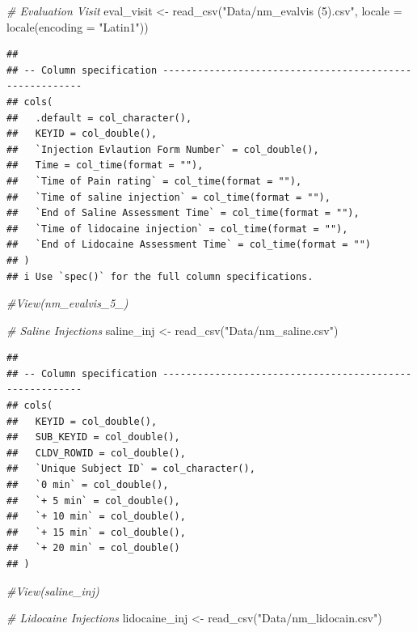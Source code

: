 \documentclass[
]{article}
\newenvironment{Shaded}{\begin{snugshade}}{\end{snugshade}}
\newcommand{\AttributeTok}[1]{\textcolor[rgb]{0.77,0.63,0.00}{#1}}
\newcommand{\CommentTok}[1]{\textcolor[rgb]{0.56,0.35,0.01}{\textit{#1}}}
\newcommand{\FunctionTok}[1]{\textcolor[rgb]{0.00,0.00,0.00}{#1}}
\newcommand{\NormalTok}[1]{#1}
\newcommand{\OtherTok}[1]{\textcolor[rgb]{0.56,0.35,0.01}{#1}}
\newcommand{\StringTok}[1]{\textcolor[rgb]{0.31,0.60,0.02}{#1}}
\begin{document}
\begin{Shaded}
\begin{Highlighting}[]
\CommentTok{\# Evaluation Visit}
\NormalTok{eval\_visit }\OtherTok{\textless{}{-}} \FunctionTok{read\_csv}\NormalTok{(}\StringTok{"Data/nm\_evalvis (5).csv"}\NormalTok{, }\AttributeTok{locale =} \FunctionTok{locale}\NormalTok{(}\AttributeTok{encoding =} \StringTok{"Latin1"}\NormalTok{))}
\end{Highlighting}
\end{Shaded}

\begin{verbatim}
## 
## -- Column specification --------------------------------------------------------
## cols(
##   .default = col_character(),
##   KEYID = col_double(),
##   `Injection Evlaution Form Number` = col_double(),
##   Time = col_time(format = ""),
##   `Time of Pain rating` = col_time(format = ""),
##   `Time of saline injection` = col_time(format = ""),
##   `End of Saline Assessment Time` = col_time(format = ""),
##   `Time of lidocaine injection` = col_time(format = ""),
##   `End of Lidocaine Assessment Time` = col_time(format = "")
## )
## i Use `spec()` for the full column specifications.
\end{verbatim}

\begin{Shaded}
\begin{Highlighting}[]
\CommentTok{\#View(nm\_evalvis\_5\_)}

\CommentTok{\# Saline Injections}
\NormalTok{saline\_inj }\OtherTok{\textless{}{-}} \FunctionTok{read\_csv}\NormalTok{(}\StringTok{"Data/nm\_saline.csv"}\NormalTok{)}
\end{Highlighting}
\end{Shaded}

\begin{verbatim}
## 
## -- Column specification --------------------------------------------------------
## cols(
##   KEYID = col_double(),
##   SUB_KEYID = col_double(),
##   CLDV_ROWID = col_double(),
##   `Unique Subject ID` = col_character(),
##   `0 min` = col_double(),
##   `+ 5 min` = col_double(),
##   `+ 10 min` = col_double(),
##   `+ 15 min` = col_double(),
##   `+ 20 min` = col_double()
## )
\end{verbatim}

\begin{Shaded}
\begin{Highlighting}[]
\CommentTok{\#View(saline\_inj)}

\CommentTok{\# Lidocaine Injections}
\NormalTok{lidocaine\_inj }\OtherTok{\textless{}{-}} \FunctionTok{read\_csv}\NormalTok{(}\StringTok{"Data/nm\_lidocain.csv"}\NormalTok{)}
\end{Highlighting}
\end{Shaded}
\end{document}
